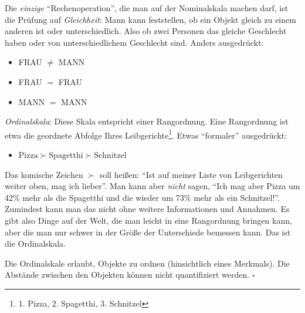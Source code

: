 \documentclass[
  a4paper,
  DIV=11]{scrreprt}
\providecommand{\tightlist}{%
  \setlength{\itemsep}{0pt}\setlength{\parskip}{0pt}}\usepackage{longtable,booktabs,array}
\theoremstyle{definition}
\theoremstyle{definition}
\theoremstyle{definition}
\theoremstyle{remark}
\begin{document}
Die \emph{einzige} ``Rechenoperation'', die man auf der Nominalskala
machen darf, ist die Prüfung auf \emph{Gleichheit}: Mann kann
feststellen, ob ein Objekt gleich zu einem anderen ist oder
unterschiedlich. Also ob zwei Personen das gleiche Geschlecht haben oder
von unterschiedlichem Geschlecht sind. Anders ausgedrückt:

\begin{itemize}
\tightlist
\item
  FRAU \(\ne\) MANN
\item
  FRAU \(=\) FRAU
\item
  MANN \(=\) MANN
\end{itemize}

\emph{Ordinalskala}: Diese Skala entspricht einer Rangordnung. Eine
Rangordnung ist etwa die geordnete Abfolge Ihres
Leibgerichte\footnote{1. Pizza, 2. Spagetthi, 3. Schnitzel}. Etwas
``formaler'' ausgedrückt:

\begin{itemize}
\tightlist
\item
  \(\text{Pizza} \succ \text{Spagetthi} \succ \text{Schnitzel}\)
\end{itemize}

Das komische Zeichen \(\succ\) soll heißen: ``Ist auf meiner Liste von
Leibgerichten weiter oben, mag ich lieber''. Man kann aber \emph{nicht}
sagen, ``Ich mag aber Pizza um 42\% mehr als die Spagetthi und die
wieder um 73\% mehr als ein Schnitzel!''. Zumindest kann man das nicht
ohne weitere Informationen und Annahmen. Es gibt also Dinge auf der
Welt, die man leicht in eine Rangordnung bringen kann, aber die man nur
schwer in der Größe der Unterschiede bemessen kann. Das ist die
Ordinalskala.

\begin{tcolorbox}[enhanced jigsaw, leftrule=.75mm, opacitybacktitle=0.6, colback=white, colframe=quarto-callout-important-color-frame, coltitle=black, colbacktitle=quarto-callout-important-color!10!white, opacityback=0, left=2mm, breakable, titlerule=0mm, toptitle=1mm, bottomtitle=1mm, rightrule=.15mm, title=\textcolor{quarto-callout-important-color}{\faExclamation}\hspace{0.5em}{Wichtig}, arc=.35mm, bottomrule=.15mm, toprule=.15mm]

Die Ordinalskale erlaubt, Objekte zu ordnen (hinsichtlich eines
Merkmals). Die Abstände zwischen den Objekten können nicht quantifiziert
werden. \(\square\)

\end{tcolorbox}
\end{document}
